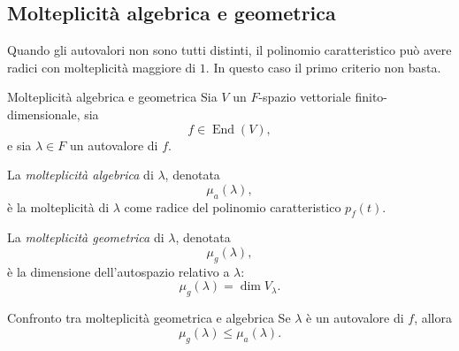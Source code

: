 \documentclass[a4paper]{article}
\begin{document}
\subsection{Molteplicità algebrica e geometrica}

Quando gli autovalori non sono tutti distinti, il polinomio caratteristico può avere radici con molteplicità maggiore di \(1\). In questo caso il primo criterio non basta.

\begin{snippetdefinition}{Molteplicità algebrica e geometrica}
    Sia \(V\) un \(F\)-spazio vettoriale finito-dimensionale, sia
    \[
        f\in\operatorname{End}(V),
    \]
    e sia \(\lambda\in F\) un autovalore di \(f\).

    La \emph{molteplicità algebrica} di \(\lambda\), denotata
    \[
        \mu_a(\lambda),
    \]
    è la molteplicità di \(\lambda\) come radice del polinomio caratteristico \(p_f(t)\).

    La \emph{molteplicità geometrica} di \(\lambda\), denotata
    \[
        \mu_g(\lambda),
    \]
    è la dimensione dell'autospazio relativo a \(\lambda\):
    \[
        \mu_g(\lambda)=\dim V_\lambda.
    \]
\end{snippetdefinition}

\begin{snippetlemma}{Confronto tra molteplicità geometrica e algebrica}
    Se \(\lambda\) è un autovalore di \(f\), allora
    \[
        \mu_g(\lambda)\leq \mu_a(\lambda).
    \]
\end{snippetlemma}
\end{document}
